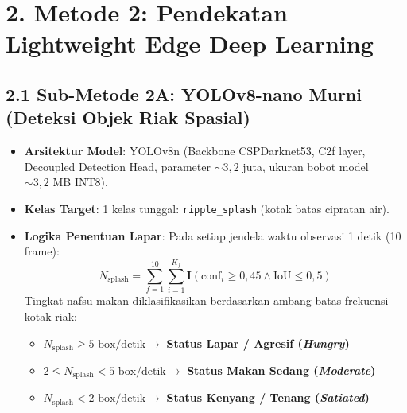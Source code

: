 \documentclass[10pt,a4paper]{article}
\providecommand{\text}[1]{\mbox{#1}}
\begin{document}
\section*{2. Metode 2: Pendekatan Lightweight Edge Deep Learning}

\subsection*{2.1 Sub-Metode 2A: YOLOv8-nano Murni (Deteksi Objek Riak Spasial)}
\begin{itemize}
    \item \textbf{Arsitektur Model}: YOLOv8n (Backbone CSPDarknet53, C2f layer, Decoupled Detection Head, parameter $\sim 3{,}2$ juta, ukuran bobot model $\sim 3{,}2\text{ MB}$ INT8).
    \item \textbf{Kelas Target}: 1 kelas tunggal: \texttt{ripple\_splash} (kotak batas cipratan air).
    \item \textbf{Logika Penentuan Lapar}: Pada setiap jendela waktu observasi 1 detik (10 frame):
    \begin{equation}
        N_{\text{splash}} = \sum_{f=1}^{10} \sum_{i=1}^{K_f} \mathbf{I}(\text{conf}_i \ge 0{,}45 \land \text{IoU} \le 0{,}5)
    \end{equation}
    Tingkat nafsu makan diklasifikasikan berdasarkan ambang batas frekuensi kotak riak:
    \begin{itemize}
        \item $N_{\text{splash}} \ge 5\text{ box/detik} \to$ \textbf{Status Lapar / Agresif (\textit{Hungry})}
        \item $2 \le N_{\text{splash}} < 5\text{ box/detik} \to$ \textbf{Status Makan Sedang (\textit{Moderate})}
        \item $N_{\text{splash}} < 2\text{ box/detik} \to$ \textbf{Status Kenyang / Tenang (\textit{Satiated})}
    \end{itemize}
\end{itemize}
\end{document}
